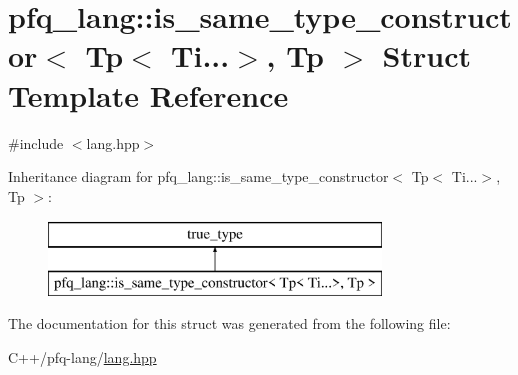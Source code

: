 \hypertarget{structpfq__lang_1_1is__same__type__constructor_3_01Tp_3_01Ti_8_8_8_4_00_01Tp_01_4}{\section{pfq\+\_\+lang\+:\+:is\+\_\+same\+\_\+type\+\_\+constructor$<$ Tp$<$ Ti...$>$, Tp $>$ Struct Template Reference}
\label{structpfq__lang_1_1is__same__type__constructor_3_01Tp_3_01Ti_8_8_8_4_00_01Tp_01_4}
}


{\ttfamily \#include $<$lang.\+hpp$>$}

Inheritance diagram for pfq\+\_\+lang\+:\+:is\+\_\+same\+\_\+type\+\_\+constructor$<$ Tp$<$ Ti...$>$, Tp $>$\+:\begin{figure}[H]
\begin{center}
\leavevmode
\includegraphics[height=2.000000cm]{structpfq__lang_1_1is__same__type__constructor_3_01Tp_3_01Ti_8_8_8_4_00_01Tp_01_4}
\end{center}
\end{figure}


The documentation for this struct was generated from the following file\+:\begin{DoxyCompactItemize}
\item 
C++/pfq-\/lang/\hyperlink{lang_8hpp}{lang.\+hpp}\end{DoxyCompactItemize}
